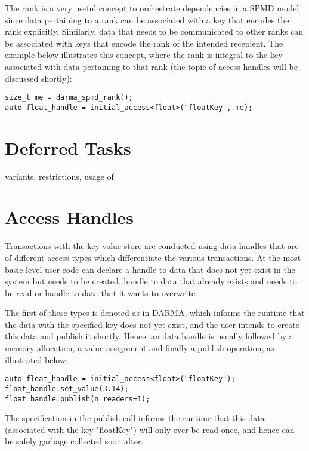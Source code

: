 The rank is a very useful concept to orchestrate dependencies in a SPMD model since data pertaining to a rank can be associated
with a key that encodes the rank explicitly. Similarly, data that needs to be communicated to other ranks can be associated with
keys that encode the rank of the intended recepient. The example below illustrates this concept, where the rank is integral to
the key associated with data pertaining to that rank (the topic of access handles will be discussed shortly):
\begin{lstlisting}
size_t me = darma_spmd_rank();
auto float_handle = initial_access<float>("floatKey", me);
\end{lstlisting}  


\section{Deferred Tasks}
\label{sec:deferred}

variants, restrictions, usage of 


\section{Access Handles}
\label{sec:handles}

Transactions with the key-value store are conducted using data handles that are of different access types which differentiate the 
various transactions. At the most basic level user code can declare a handle to data that does not yet exist in the system
but needs to be created, handle to data that already exists and needs to be read or handle to data that it wants to overwrite. 

The first of these types is denoted as  in DARMA, which informs the runtime that the data with the 
specified key does not yet exist, and the user intends to create this data and publish it shortly. Hence, an 
data handle is usually followed by a memory allocation, a value assignment and finally a publish operation, as illustrated below: 
\begin{lstlisting}
auto float_handle = initial_access<float>("floatKey");
float_handle.set_value(3.14);
float_handle.publish(n_readers=1);
\end{lstlisting}
The  specification in the publish call informs the runtime that this data (associated with the key "floatKey") will
only ever be read once, and hence can be safely garbage collected soon after.


